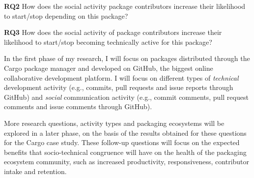 \noindent \textbf{RQ2} How does the social activity package contributors increase their likelihood to start/stop depending on this package?

\noindent \textbf{RQ3} How does the social activity of package contributors increase their likelihood to start/stop becoming technically active for this package?


In the first phase of my research, I will focus on packages distributed through the Cargo package manager and developed on GitHub, the biggest online collaborative development platform.
%
I will focus on different types of \emph{technical} development activity (e.g., commits, pull requests and issue reports through GitHub) and \emph{social} communication activity (e.g., commit comments, pull request comments and issue comments through GitHub). 

More research questions, activity types and packaging ecosystems will be explored in a later phase, on the basis of the results obtained for these questions for the Cargo case study. These follow-up questions will focus on the expected benefits that socio-technical congruence will have on the health of the packaging ecosystem community, such as increased productivity, responsiveness, contributor intake and retention.